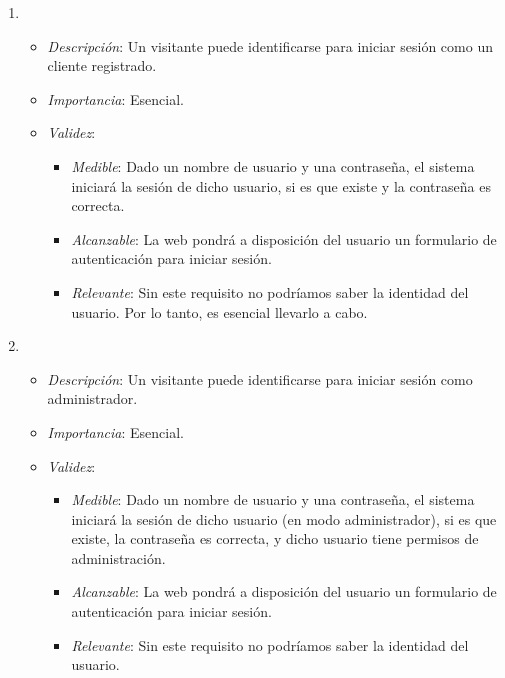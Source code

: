 \begin{enumerate}[{\bf RF-1}]
\item 
  \begin{itemize}
  \item \textit{Descripción}: Un visitante puede identificarse para iniciar sesión como un cliente registrado.
  \item \textit{Importancia}: Esencial.
  \item \textit{Validez}:
    \begin{itemize}
    \item \textit{Medible}: Dado un nombre de usuario y una contraseña, el sistema iniciará la sesión de dicho usuario, si es que existe y la contraseña es correcta.
    \item \textit{Alcanzable}: La web pondrá a disposición del usuario un formulario de autenticación para iniciar sesión.
    \item \textit{Relevante}: Sin este requisito no podríamos saber la identidad del usuario. Por lo tanto, es esencial llevarlo a cabo.
    \end{itemize}
  \end{itemize}


\item 
  \begin{itemize}
  \item \textit{Descripción}: Un visitante puede identificarse para iniciar sesión como administrador.
  \item \textit{Importancia}: Esencial.
  \item \textit{Validez}:
    \begin{itemize}
    \item \textit{Medible}: Dado un nombre de usuario y una contraseña, el sistema iniciará la sesión de dicho usuario (en modo administrador), si es que existe, la contraseña es correcta, y dicho usuario tiene permisos de administración.
    \item \textit{Alcanzable}: La web pondrá a disposición del usuario un formulario de autenticación para iniciar sesión.
    \item \textit{Relevante}: Sin este requisito no podríamos saber la identidad del usuario.
    \end{itemize}
  \end{itemize}



\end{enumerate}

